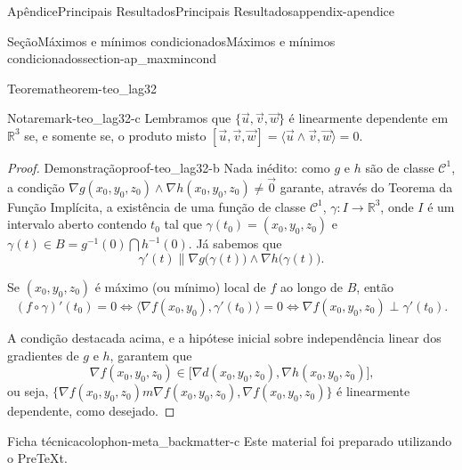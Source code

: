 \documentclass[oneside,10pt,]{book}
\numberwithin{equation}{section}
\providecommand\phantomsection{}
\newcommand{\R}{\mathbb R}
\begin{document}
\begin{appendixptx}{Apêndice}{Principais Resultados}{}{Principais Resultados}{}{}{appendix-apendice}
\begin{sectionptx}{Seção}{Máximos e mínimos condicionados}{}{Máximos e mínimos condicionados}{}{}{section-ap_maxmincond}
\begin{theorem}{Teorema}{}{}{theorem-teo_lag32}
\begin{remark}{Nota}{}{remark-teo_lag32-c}
Lembramos que \(\{\vec{u},\vec{v},\vec{w}\}\) é linearmente dependente em \(\R^3\) se, e somente se, o produto misto \([\vec{u},\vec{v},\vec{w}]=\langle
\vec{u}\wedge\vec{v},\vec{w}\rangle=0\).\end{remark}
\end{theorem}
\begin{proof}{Demonstração}{}{proof-teo_lag32-b}
Nada inédito: como \(g\) e \(h\) são de classe \(\mathscr{C}^1\), a condição \(\nabla
g(x_0,y_0,z_0)\wedge\nabla h(x_0,y_0,z_0)\neq\vec{0}\) garante, através do Teorema da Função Implícita, a existência de uma função de classe \(\mathscr{C}^1\), \(\gamma\colon I\to\R^3\), onde \(I\) é um intervalo aberto contendo \(t_0\) tal que \(\gamma(t_0)=(x_0,y_0,z_0)\) e \(\gamma(t)\in
B=g^{-1}(0)\bigcap h^{-1}(0)\). Já sabemos que%
\begin{equation*}
\gamma'(t)\parallel \nabla g\big(\gamma(t)\big)\wedge\nabla
h\big(\gamma(t)\big)\text{.}
\end{equation*}
%
\par
Se \((x_0,y_0,z_0)\) é máximo (ou mínimo) local de \(f\) ao longo de \(B\), então%
\begin{equation*}
(f\circ\gamma)'(t_0)=0\iff
\langle\nabla f(x_0,y_0),\gamma'(t_0)\rangle=0\iff \boxed{\nabla
f(x_0,y_0,z_0)\perp\gamma'(t_0)}.
\end{equation*}
%
\par
A condição destacada acima, e a hipótese inicial sobre independência linear dos gradientes de \(g\) e \(h\), garantem que%
\begin{equation*}
\nabla f(x_0,y_0,z_0)\in\big[\nabla
d(x_0,y_0,z_0),\nabla h(x_0,y_0,z_0)\big]\text{,}
\end{equation*}
ou seja, \(\big\{\nabla f(x_0,y_0,z_0)m\nabla f(x_0,y_0,z_0),\nabla
f(x_0,y_0,z_0)\big\}\) é linearmente dependente, como desejado.%
\end{proof}
\end{sectionptx}
\end{appendixptx}
%
\backmatter%
%
\clearpage\phantomsection%
%
\clearpage
\pagestyle{empty}
\begin{backcolophon}{Ficha técnica}{colophon-meta_backmatter-c}%
Este material foi preparado utilizando o PreTeXt.%
\end{backcolophon}%
\end{document}
